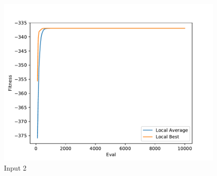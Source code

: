 \documentclass{standalone}
\begin{document}
\begin{figure}[!htb]
	\caption{Input 2}
	\label{fig:graph_2037}
	\includegraphics[width=\textwidth]{../graphs/graphs/2037.pdf}
\end{figure}
\end{document}
